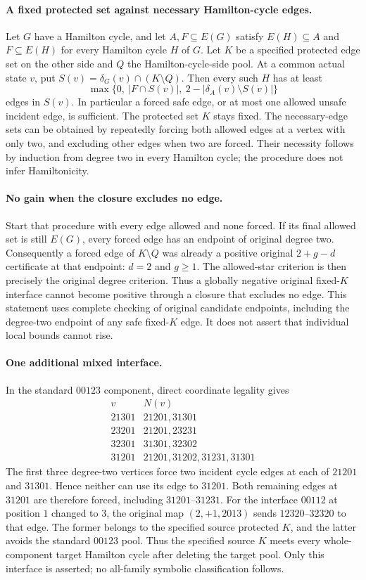 \paragraph{A fixed protected set against necessary Hamilton-cycle edges.}
Let $G$ have a Hamilton cycle, and let $A,F\subseteq E(G)$ satisfy
$E(H)\subseteq A$ and $F\subseteq E(H)$ for every Hamilton cycle $H$ of $G$.
Let $K$ be a specified protected edge set on the other side and $Q$ the
Hamilton-cycle-side pool. At a common actual state $v$, put
$S(v)=\delta_G(v)\cap(K\setminus Q)$. Then every such $H$ has at least
\[
 \max\{0,\ |F\cap S(v)|,\ 2-|\delta_A(v)\setminus S(v)|\}
\]
edges in $S(v)$. In particular a forced safe edge, or at most one allowed
unsafe incident edge, is sufficient. The protected set $K$ stays fixed.
The necessary-edge sets can be obtained by repeatedly forcing both allowed
edges at a vertex with only two, and excluding other edges when two are forced.
Their necessity follows by induction from degree two in every Hamilton cycle;
the procedure does not infer Hamiltonicity.

\paragraph{No gain when the closure excludes no edge.}
Start that procedure with every edge allowed and none forced. If its final
allowed set is still $E(G)$, every forced edge has an endpoint of original
degree two. Consequently a forced edge of $K\setminus Q$ was already a
positive original $2+g-d$ certificate at that endpoint: $d=2$ and $g\ge1$.
The allowed-star criterion is then precisely the original degree criterion.
Thus a globally negative original fixed-$K$ interface cannot become positive
through a closure that excludes no edge. This statement uses complete checking
of original candidate endpoints, including the degree-two endpoint of any
safe fixed-$K$ edge. It does not assert that individual local bounds cannot rise.

\paragraph{One additional mixed interface.}
In the standard $00123$ component, direct coordinate legality gives
\[
\begin{array}{c|l}
v&N(v)\\\hline
21301&21201,31301\\
23201&21201,23231\\
32301&31301,32302\\
31201&21201,31202,31231,31301
\end{array}
\]
The first three degree-two vertices force two incident cycle edges at each
of $21201$ and $31301$. Hence neither can use its edge to $31201$.
Both remaining edges at $31201$ are therefore forced, including
$31201$--$31231$. For the interface $00112$ at position $1$ changed to $3$,
the original map $(2,+1,2013)$ sends $12320$--$32320$ to that edge.
The former belongs to the specified source protected $K$, and the latter
avoids the standard $00123$ pool. Thus the specified source $K$ meets every
whole-component target Hamilton cycle after deleting the target pool.
Only this interface is asserted; no all-family symbolic classification follows.
